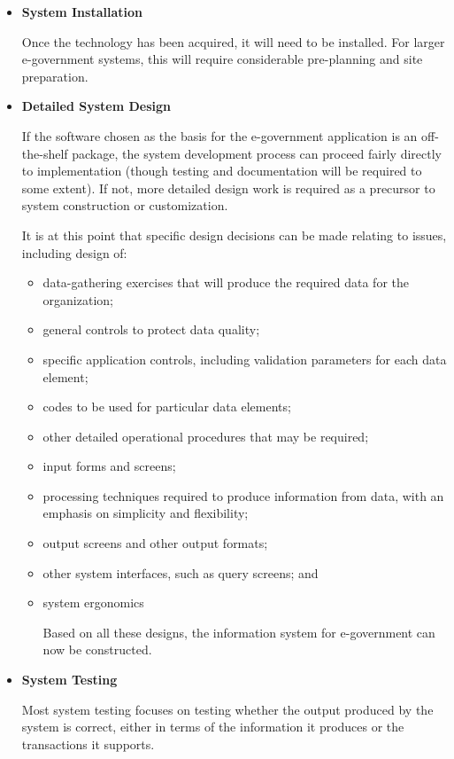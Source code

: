 \begin{itemize}
	\item \textbf{System Installation}
	
	Once the technology has been acquired, it
	will need to be installed. For larger e-government systems, this will require considerable pre-planning and site preparation.
	
	\item \textbf{Detailed System Design}
	
	If the software chosen as the basis for the
	e-government application is an off-the-shelf
	package, the system development process
	can proceed fairly directly to implementation (though testing and documentation
	will be required to some extent). If not,
	more detailed design work is required as
	a precursor to system construction or
	customization.
	
	It is at this point that specific design decisions can be made relating to issues, including
	design of:
	\begin{itemize}
		\item data-gathering exercises that will produce
		the required data for the organization;
		\item general controls to protect data quality;
		\item specific application controls, including
		validation parameters for each data
		element;
		\item codes to be used for particular data
		elements;
		\item other detailed operational procedures
		that may be required;
		\item input forms and screens;
		\item processing techniques required to produce information from data, with an
		emphasis on simplicity and flexibility;
		\item output screens and other output formats;
		\item other system interfaces, such as query
		screens; and
		\item system ergonomics
		
		Based on all these designs, the information
		system for e-government can now be
		constructed.
		
	\end{itemize}
\item \textbf{System Testing}

Most system testing focuses on
testing whether the output produced by the
system is correct, either in terms of the
information it produces or the transactions
it supports.


\end{itemize}
